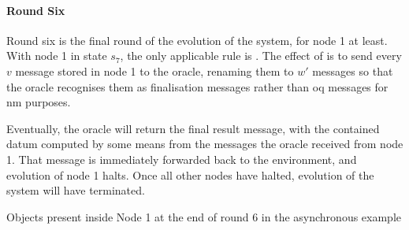 \paragraph{Round Six}
Round six is the final round of the evolution of the system, for node 1 at least.  With node 1 in state \(s_7\), the only applicable rule is .  The effect of  is to send every \(v\) message stored in node 1 to the oracle, renaming them to \(w'\) messages so that the oracle recognises them as finalisation messages rather than \gls{oq} messages for \gls{nm} purposes.

Eventually, the oracle will return the final result message, with the contained datum computed by some means from the messages the oracle received from node 1.  That message is immediately forwarded back to the environment, and evolution of node 1 halts.  Once all other nodes have halted, evolution of the system will have terminated.

\begin{cpobjectsfloat}
\begin{cpobjects}
\end{cpobjects}
\caption{\label{objs:nmp:ex6}Objects present inside Node 1 at the end of round 6 in the asynchronous  example}
\end{cpobjectsfloat}